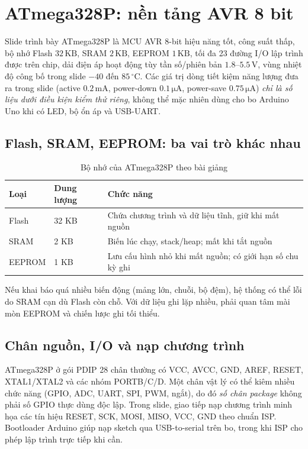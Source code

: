 \section{ATmega328P: nền tảng AVR 8 bit}
Slide trình bày ATmega328P là MCU AVR 8-bit hiệu năng tốt, công suất thấp, bộ nhớ Flash $32\,\mathrm{KB}$, SRAM $2\,\mathrm{KB}$, EEPROM $1\,\mathrm{KB}$, tối đa 23 đường I/O lập trình được trên chip, dải điện áp hoạt động tùy tần số/phiên bản $1.8$--$5.5\,\mathrm{V}$, vùng nhiệt độ công bố trong slide $-40$ đến $85\,{}^{\circ}\mathrm C$. Các giá trị dòng tiết kiệm năng lượng đưa ra trong slide (active $0.2\,\mathrm{mA}$, power-down $0.1\,\mathrm{\mu A}$, power-save $0.75\,\mathrm{\mu A}$) \emph{chỉ là số liệu dưới điều kiện kiểm thử riêng}, không thể mặc nhiên dùng cho bo Arduino Uno khi có LED, bộ ổn áp và USB-UART.

\subsection{Flash, SRAM, EEPROM: ba vai trò khác nhau}
\begin{table}[htbp]\centering\small
\caption{Bộ nhớ của ATmega328P theo bài giảng}
\begin{tabularx}{\textwidth}{p{28mm}p{25mm}X}
\toprule
Loại & Dung lượng & Chức năng\\\midrule
Flash & 32 KB & Chứa chương trình và dữ liệu tĩnh, giữ khi mất nguồn\\
SRAM & 2 KB & Biến lúc chạy, stack/heap; mất khi tắt nguồn\\
EEPROM & 1 KB & Lưu cấu hình nhỏ khi mất nguồn; có giới hạn số chu kỳ ghi\\\bottomrule
\end{tabularx}
\end{table}
Nếu khai báo quá nhiều biến động (mảng lớn, chuỗi, bộ đệm), hệ thống có thể lỗi do SRAM cạn dù Flash còn chỗ. Với dữ liệu ghi lặp nhiều, phải quan tâm mài mòn EEPROM và chiến lược ghi tối thiểu.

\subsection{Chân nguồn, I/O và nạp chương trình}
ATmega328P ở gói PDIP 28 chân thường có VCC, AVCC, GND, AREF, RESET, XTAL1/XTAL2 và các nhóm PORTB/C/D. Một chân vật lý có thể kiêm nhiều chức năng (GPIO, ADC, UART, SPI, PWM, ngắt), do đó \emph{số chân package} không phải số GPIO thực dùng độc lập. Trong slide, giao tiếp nạp chương trình minh họa các tín hiệu RESET, SCK, MOSI, MISO, VCC, GND theo chuẩn ISP. Bootloader Arduino giúp nạp sketch qua USB-to-serial trên bo, trong khi ISP cho phép lập trình trực tiếp khi cần.

